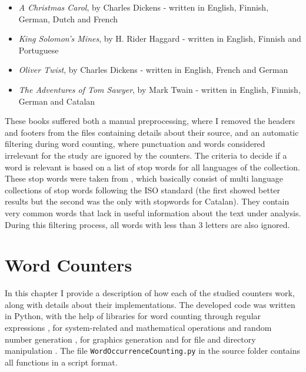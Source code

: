 \documentclass[shortpaper]{revdetua}
\begin{document}
\begin{itemize}
    \item \textit{A Christmas Carol}, by Charles Dickens - written in English, Finnish, German, Dutch and French
    \item \textit{King Solomon's Mines}, by H. Rider Haggard - written in English, Finnish and Portuguese
    \item \textit{Oliver Twist}, by Charles Dickens - written in English, French and German
    \item \textit{The Adventures of Tom Sawyer}, by Mark Twain - written in English, Finnish, German and Catalan
\end{itemize}

These books suffered both a manual preprocessing, where I removed the headers and
footers from the files containing details about their source, and an automatic 
filtering during word counting, where punctuation and words considered irrelevant 
for the study are ignored by the counters.
The criteria to decide if a word is relevant is based on a list of stop words 
for all languages of the collection.
These stop words were taken from \cite{nltk} \cite{stopwords}, which basically 
consist of multi language collections of stop words following the ISO standard 
(the first showed better results but the second was the only with stopwords for Catalan).
They contain very common words that lack in useful information about the text under analysis.
During this filtering process, all words with less than 3 letters are also ignored.


\section{Word Counters}

In this chapter I provide a description of how each of the studied counters work,
along with details about their implementations.
The developed code was written in Python, with the help of libraries for word 
counting \cite{lib_counter} through regular expressions \cite{lib_re}, for 
system-related and mathematical operations \cite{lib_sys} \cite{lib_math} and 
random number generation \cite{lib_random}, for graphics generation 
\cite{lib_numpy} \cite{lib_matplotlib} and for file and directory manipulation 
\cite{lib_os} \cite{lib_shutil}.
The file \texttt{WordOccurrenceCounting.py} in the source folder contains 
all functions in a script format.
\end{document}
